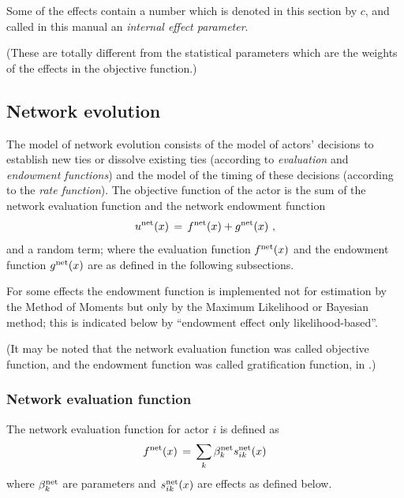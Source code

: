 \documentclass[a4paper,fleqn]{article}
\newcommand{\+}{\, + \,}
\begin{document}
{\hypertarget{T_effpar}{
Some of the effects contain a number which is denoted in this section
by $c$, and called in this manual an \emph{internal effect parameter}.
}
(These are totally different from the statistical parameters which are
the weights of the effects in the objective function.)

\subsection{Network evolution}
The model of network evolution consists of the model of actors'
decisions to establish new ties or dissolve existing ties
(according to {\it evaluation} and {\it endowment functions}) and the
model of the timing of these decisions (according to the {\it rate
function}).
The objective function of the actor is the sum of the
network evaluation
function and the network endowment function
\begin{equation}
u^{\rm net}(x) \, = \, f^{\rm net}(x) + g^{\rm net}(x)  \ , \label{u_net}
\end{equation}
and a random term; where the evaluation function $f^{\rm net}(x)$ and the endowment
function $g^{\rm net}(x)$ are as defined in the following subsections.

For some effects %
the endowment function is implemented not for estimation by the Method of Moments
but only by the Maximum Likelihood or Bayesian method;
this is indicated below by ``endowment effect only likelihood-based''.

(It may be noted that the network evaluation function was called objective function,
and the endowment function was called gratification function, in
\citet{Snijders01}.)

\subsubsection{Network evaluation function}
\label{S_f}

The network evaluation function for actor $i$ is defined as
\begin{equation}
f^{\rm net}(x) \, = \, \sum_k \beta^{\rm net}_k s^{\rm net}_{ik}(x)   \label{f_net}
\end{equation}
where $\beta^{\rm net}_k$ are parameters and $s^{\rm net}_{ik}(x)$
are effects as defined below.

}
\end{document}
